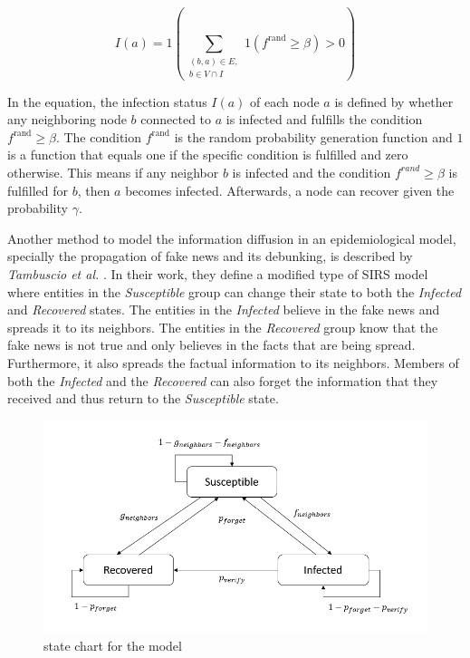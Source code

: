 \begin{equation}
    I(a) = 1 (\sum\limits_{\substack{(b,a)\in E, \\ b \in V \cap I}}
    1(f^{\mathrm{rand}}\geq \beta)>0) 
    \label{eqbasicpropagation}
\end{equation}

In the equation, the infection status $I(a)$ of each node $a$ is defined 
by whether any neighboring node $b$ connected to $a$ is infected 
and fulfills the condition $f^{\mathrm{rand}}\geq \beta$.
The condition $f^{\mathrm{rand}}$ is the random probability generation function and $1$ 
is a function that equals one if the specific condition is fulfilled and 
zero otherwise. This means if any neighbor $b$ is infected and the 
condition $f^{rand}\geq \beta$ is fulfilled for $b$, then $a$ becomes infected. 
Afterwards, a node can recover given the probability $\gamma$.

Another method to model the information diffusion in an epidemiological model, 
specially the propagation of fake news and its debunking,
is described by \textit{Tambuscio et al.} \cite{sirsmodel}. In their work, they
define a modified type of SIRS model where entities in the \textit{Susceptible}
group can change their state to both the \textit{Infected} and
\textit{Recovered} states.
The entities in the \textit{Infected} believe in the fake news and spreads it 
to its neighbors.
The entities in the \textit{Recovered} group know that the fake news is not 
true and only believes in the facts that are being spread. Furthermore, it
also spreads the factual information to its neighbors.
Members of both the \textit{Infected} and the \textit{Recovered} can also forget
the information that they received and thus return to the \textit{Susceptible} state.

\begin{figure}[!ht]
    \center
    \includegraphics[scale=.9]{figs/Tambuscio.png}
    \caption{state chart for the model \cite{sirsmodel}}
    \label{originalmodelstatechart}
\end{figure}

